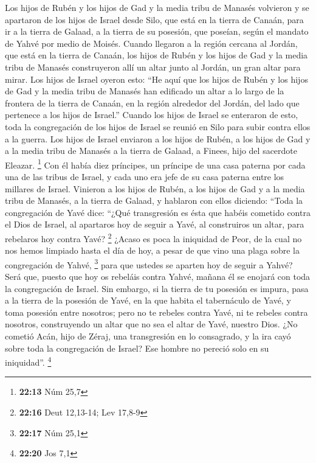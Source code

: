  Los hijos de Rubén y los hijos de Gad y la media tribu de
Manasés volvieron y se apartaron de los hijos de Israel desde Silo, que
está en la tierra de Canaán, para ir a la tierra de Galaad, a la tierra
de su posesión, que poseían, según el mandato de Yahvé por medio de
Moisés.  Cuando llegaron a la región cercana al Jordán,
que está en la tierra de Canaán, los hijos de Rubén y los hijos de Gad y
la media tribu de Manasés construyeron allí un altar junto al Jordán, un
gran altar para mirar.  Los hijos de Israel oyeron esto:
``He aquí que los hijos de Rubén y los hijos de Gad y la media tribu de
Manasés han edificado un altar a lo largo de la frontera de la tierra de
Canaán, en la región alrededor del Jordán, del lado que pertenece a los
hijos de Israel.''  Cuando los hijos de Israel se
enteraron de esto, toda la congregación de los hijos de Israel se reunió
en Silo para subir contra ellos a la guerra.  Los hijos
de Israel enviaron a los hijos de Rubén, a los hijos de Gad y a la media
tribu de Manasés a la tierra de Galaad, a Finees, hijo del sacerdote
Eleazar. \footnote{\textbf{22:13} Núm 25,7}  Con él había
diez príncipes, un príncipe de una casa paterna por cada una de las
tribus de Israel, y cada uno era jefe de su casa paterna entre los
millares de Israel.  Vinieron a los hijos de Rubén, a los
hijos de Gad y a la media tribu de Manasés, a la tierra de Galaad, y
hablaron con ellos diciendo:  ``Toda la congregación de
Yavé dice: ``¿Qué transgresión es ésta que habéis cometido contra el
Dios de Israel, al apartaros hoy de seguir a Yavé, al construiros un
altar, para rebelaros hoy contra Yavé? \footnote{\textbf{22:16} Deut
  12,13-14; Lev 17,8-9}  ¿Acaso es poca la iniquidad de
Peor, de la cual no nos hemos limpiado hasta el día de hoy, a pesar de
que vino una plaga sobre la congregación de Yahvé, \footnote{\textbf{22:17}
  Núm 25,1}  para que ustedes se aparten hoy de seguir a
Yahvé? Será que, puesto que hoy os rebeláis contra Yahvé, mañana él se
enojará con toda la congregación de Israel.  Sin embargo,
si la tierra de tu posesión es impura, pasa a la tierra de la posesión
de Yavé, en la que habita el tabernáculo de Yavé, y toma posesión entre
nosotros; pero no te rebeles contra Yavé, ni te rebeles contra nosotros,
construyendo un altar que no sea el altar de Yavé, nuestro Dios.
 ¿No cometió Acán, hijo de Zéraj, una transgresión en lo
consagrado, y la ira cayó sobre toda la congregación de Israel? Ese
hombre no pereció solo en su iniquidad''. \footnote{\textbf{22:20} Jos
  7,1}

